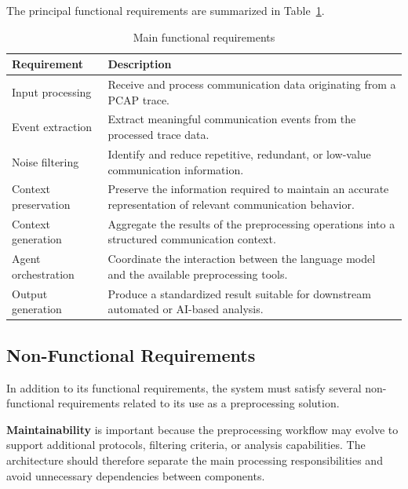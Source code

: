 The principal functional requirements are summarized in Table~\ref{tab:functional_requirements}.

\begin{table}[H]
\centering
\caption{Main functional requirements}
\label{tab:functional_requirements}

\begin{tabular}{p{} p{}}
\toprule
\textbf{Requirement} & \textbf{Description} \\
\midrule

Input processing &
Receive and process communication data originating from a PCAP trace. \\

Event extraction &
Extract meaningful communication events from the processed trace data. \\

Noise filtering &
Identify and reduce repetitive, redundant, or low-value communication information. \\

Context preservation &
Preserve the information required to maintain an accurate representation of relevant communication behavior. \\

Context generation &
Aggregate the results of the preprocessing operations into a structured communication context. \\

Agent orchestration &
Coordinate the interaction between the language model and the available preprocessing tools. \\

Output generation &
Produce a standardized result suitable for downstream automated or AI-based analysis. \\

\bottomrule
\end{tabular}
\end{table}

\subsection{Non-Functional Requirements}

In addition to its functional requirements, the system must satisfy several non-functional requirements related to its use as a preprocessing solution.

\textbf{Maintainability} is important because the preprocessing workflow may evolve to support additional protocols, filtering criteria, or analysis capabilities. The architecture should therefore separate the main processing responsibilities and avoid unnecessary dependencies between components.

